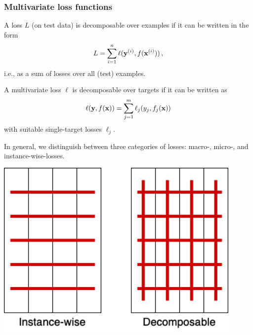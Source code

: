 \documentclass[11pt,compress,t,notes=noshow, xcolor=table]{beamer}
\begin{document}
\begin{frame}
	\frametitle{Multivariate loss functions}
	\small
	\begin{itemize}
%		
%
		\item A loss $L$ (on test data) is decomposable over examples if it can be written in the form
		$$
		L = \sum_{i=1}^n \ell(\mathbf{y}^{(i)}, f(\mathbf{x}^{(i)})) 
		\, ,
		$$
		i.e., as a sum of losses over all (test) examples. 
		
		
		\item A multivariate loss $\ell$ is decomposable over targets if it can be written as
		$$
		\ell(\mathbf{y}, f(\mathbf{x})) = \sum_{j=1}^m \ell_j(y_j, f_j(\mathbf{x})) 
		$$
		with suitable single-target losses $\ell_j$. 
		
%		

		\begin{minipage}{0.45\textwidth}
%			
			\item  In general, we distinguish between three categories of losses: macro-, micro-, and instance-wise-losses. 
%			
		\end{minipage}
%	
		\begin{minipage}{0.45\textwidth}
			\begin{center}
				\includegraphics[width=0.9\textwidth]{figure/fmeasure}
			\end{center}
		\end{minipage}
%		
	\end{itemize}
%
\end{frame}
\end{document}
